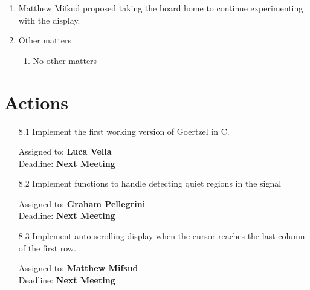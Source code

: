 \documentclass{cce2014-meetings}
\begin{document}
\begin{enumerate}
   \item Matthew Mifsud proposed taking the board home to continue experimenting with the display.

   \item Other matters
         \begin{enumerate}
            \item No other matters
         \end{enumerate}

\end{enumerate}

\section*{Actions}

\begin{enumerate}

   \item [8.1] Implement the first working version of Goertzel in C.
         \begin{flushright}
            Assigned to: \textbf{Luca Vella} \\
            Deadline: \textbf{Next Meeting}
         \end{flushright}

   \item [8.2] Implement functions to handle detecting quiet regions in the signal
         \begin{flushright}
            Assigned to: \textbf{Graham Pellegrini} \\
            Deadline: \textbf{Next Meeting}
         \end{flushright}

   \item [8.3] Implement auto-scrolling display when the cursor reaches the last column of the first row.
         \begin{flushright}
            Assigned to: \textbf{Matthew Mifsud} \\
            Deadline: \textbf{Next Meeting}
         \end{flushright}

\end{enumerate}
\end{document}
